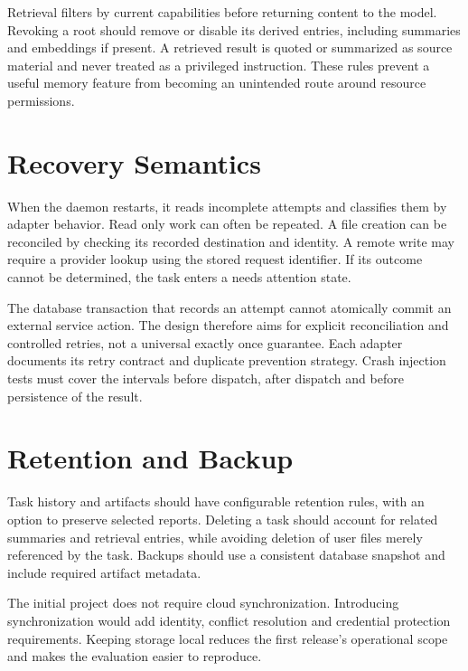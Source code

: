 Retrieval filters by current capabilities before returning content to the model. Revoking a root should remove or disable its derived entries, including summaries and embeddings if present. A retrieved result is quoted or summarized as source material and never treated as a privileged instruction. These rules prevent a useful memory feature from becoming an unintended route around resource permissions.

\section{Recovery Semantics}
When the daemon restarts, it reads incomplete attempts and classifies them by adapter behavior. Read only work can often be repeated. A file creation can be reconciled by checking its recorded destination and identity. A remote write may require a provider lookup using the stored request identifier. If its outcome cannot be determined, the task enters a needs attention state.

The database transaction that records an attempt cannot atomically commit an external service action. The design therefore aims for explicit reconciliation and controlled retries, not a universal exactly once guarantee. Each adapter documents its retry contract and duplicate prevention strategy. Crash injection tests must cover the intervals before dispatch, after dispatch and before persistence of the result.

\section{Retention and Backup}
Task history and artifacts should have configurable retention rules, with an option to preserve selected reports. Deleting a task should account for related summaries and retrieval entries, while avoiding deletion of user files merely referenced by the task. Backups should use a consistent database snapshot and include required artifact metadata.

The initial project does not require cloud synchronization. Introducing synchronization would add identity, conflict resolution and credential protection requirements. Keeping storage local reduces the first release's operational scope and makes the evaluation easier to reproduce.
